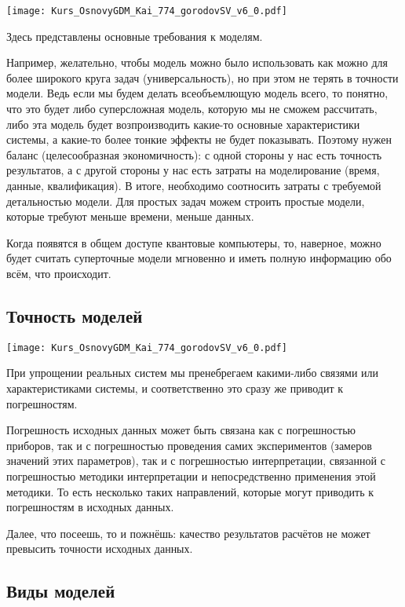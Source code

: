 \documentclass[main.tex]{subfiles}
\begin{document}
\texttt{[image: Kurs\_OsnovyGDM\_Kai\_774\_gorodovSV\_v6\_0.pdf]}

Здесь представлены основные требования к моделям.

Например, желательно, чтобы модель можно было использовать как можно для более широкого круга задач (универсальность), но при этом не терять в точности модели.
Ведь если мы будем делать всеобъемлющую модель всего, то понятно, что это будет либо суперсложная модель, которую мы не сможем рассчитать, либо эта модель будет возпроизводить какие-то основные характеристики системы, а какие-то более тонкие эффекты не будет показывать.
Поэтому нужен баланс (целесообразная экономичность): с одной стороны у нас есть точность результатов, а с другой стороны у нас есть затраты на моделирование (время, данные, квалификация).
В итоге, необходимо соотносить затраты с требуемой детальностью модели.
Для простых задач можем строить простые модели, которые требуют меньше времени, меньше данных.

Когда появятся в общем доступе квантовые компьютеры, то, наверное, можно будет считать суперточные модели мгновенно и иметь полную информацию обо всём, что происходит.

\subsection{Точность моделей}

\texttt{[image: Kurs\_OsnovyGDM\_Kai\_774\_gorodovSV\_v6\_0.pdf]}

При упрощении реальных систем мы пренебрегаем какими-либо связями или характеристиками системы, и соответственно это сразу же приводит к погрешностям.

Погрешность исходных данных может быть связана как с погрешностью приборов, так и с погрешностью проведения самих экспериментов (замеров значений этих параметров), так и с погрешностью интерпретации, связанной с погрешностью методики интерпретации и непосредственно применения этой методики.
То есть несколько таких направлений, которые могут приводить к погрешностям в исходных данных.

Далее, что посеешь, то и пожнёшь: качество результатов расчётов не может превысить точности исходных данных.

\subsection{Виды моделей}
\end{document}
